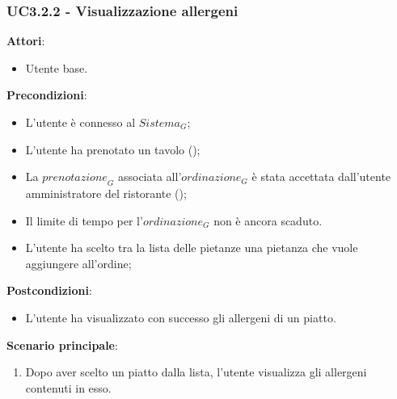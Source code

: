 \subsubsection{UC3.2.2 - Visualizzazione allergeni
}\label{usecase:3_2_2}
\textbf{Attori}:
\begin{itemize}
    \item Utente base.
\end{itemize}
\textbf{Precondizioni}:
\begin{itemize}
    \item L'utente è connesso al $\textit{Sistema}_G$; 
    \item L'utente ha prenotato un tavolo ();
    \item La $\textit{prenotazione}_G$ associata all'$\textit{ordinazione}_G$ è stata accettata dall'utente amministratore del ristorante ();
    \item Il limite di tempo per l'$\textit{ordinazione}_G$ non è ancora scaduto.
    \item L'utente ha scelto tra la lista delle pietanze una pietanza che vuole aggiungere all'ordine;
\end{itemize}
\textbf{Postcondizioni}:
\begin{itemize}
    \item L'utente ha visualizzato con successo gli allergeni di un piatto.
\end{itemize}
\textbf{Scenario principale}:
\begin{enumerate}
    \item Dopo aver scelto un piatto dalla lista, l'utente visualizza gli allergeni contenuti in esso.
\end{enumerate}

